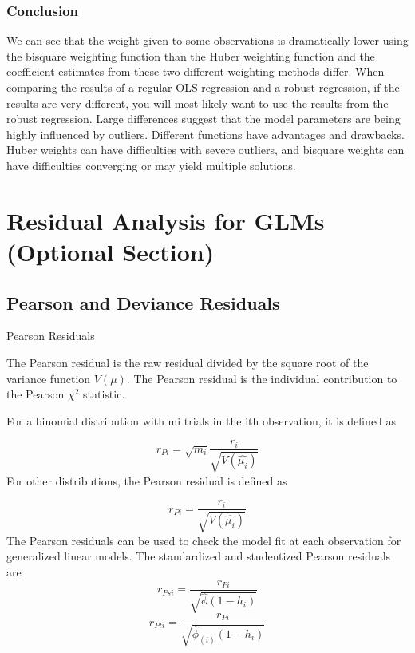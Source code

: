 \documentclass[12pt, a4paper]{article}
\theoremstyle{plain}
\theoremstyle{definition}
\theoremstyle{remark}
\begin{document}
\subsubsection{Conclusion}
We can see that the weight given to some observations is dramatically lower using the bisquare weighting function than the Huber weighting function and the coefficient estimates from these two different weighting methods differ. 
When comparing the results of a regular OLS regression and a robust regression, if the results are very different, you will most likely want to use the results from the robust regression. 
Large differences suggest that the model parameters are being highly influenced by outliers. Different functions have advantages and drawbacks. Huber weights can have difficulties with severe outliers, and bisquare weights can have difficulties converging or may yield multiple solutions. 




\newpage
\section{Residual Analysis for GLMs (Optional Section)}





\subsection{Pearson and Deviance Residuals} 

Pearson Residuals





The Pearson residual is the raw residual divided by the square root of the variance function $V(\mu).$
The Pearson residual is the individual contribution to the Pearson $\chi^2$ statistic. 

For a binomial distribution with mi trials in the ith observation, it is defined as

\[ r_{Pi} = \sqrt{ m_{i}}
 \frac{r_{i}}{\sqrt{V(\hat{ \mu_{i}})}} \]
For other distributions, the Pearson residual is defined as

\[ r_{Pi} = \frac{r_{i}}{\sqrt{V(\hat{ \mu_{i}})}}\]
The Pearson residuals can be used to check the model fit at each observation for generalized linear models. 
The standardized and studentized Pearson residuals are
\[
r_{Psi} = \frac{r_{Pi}}{\sqrt{\hat{ \phi} (1- h_{i})} } \]
\[ r_{Pti} = \frac{r_{Pi}}{\sqrt{ \hat{ \phi}_{(i)}
 (1- h_{i})} } \]
\end{document}
